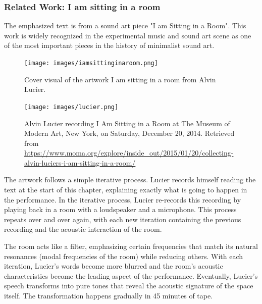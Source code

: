             \subsubsection{Related Work: I am sitting in a room}
        
                The emphasized text is from a sound art piece "I am Sitting in a Room". This work is widely recognized in the experimental music and sound art scene as one of the most important pieces in the history of minimalist sound art\cite{Lucier_phd}.\par

                \begin{figure}[H]
                    \centering
                    \texttt{[image: images/iamsittinginaroom.png]}
                    \caption{Cover visual of the artwork I am sitting in a room from Alvin Lucier.}
                    \label{fig:IASIAR}
                \end{figure}

                \begin{figure}[H]
                    \centering
                    \texttt{[image: images/lucier.png]}
                    \caption{Alvin Lucier recording I Am Sitting in a Room at The Museum of Modern Art, New York, on Saturday, December 20, 2014. Retrieved from \url{https://www.moma.org/explore/inside_out/2015/01/20/collecting-alvin-luciers-i-am-sitting-in-a-room/}}
                    \label{fig:LUCIER}
                \end{figure}            

                The artwork follows a simple iterative process. Lucier records himself reading the text at the start of this chapter, explaining exactly what is going to happen in the performance. In the iterative process, Lucier re-records this recording by playing back in a room with a loudspeaker and a microphone. This process repeats over and over again, with each new iteration containing the previous recording and the acoustic interaction of the room\cite{Alvin_Lucier_I_am_Sitting_in_a_Room}.\par

                The room acts like a filter, emphasizing certain frequencies that match its natural resonances (modal frequencies of the room\cite{Room_Acoustics}) while reducing others. With each iteration, Lucier's words become more blurred and the room's acoustic characteristics become the leading aspect of the performance. Eventually, Lucier's speech transforms into pure tones that reveal the acoustic signature of the space itself. The transformation happens gradually in 45 minutes of tape\cite{MoMa_Lucier}.\par
                
